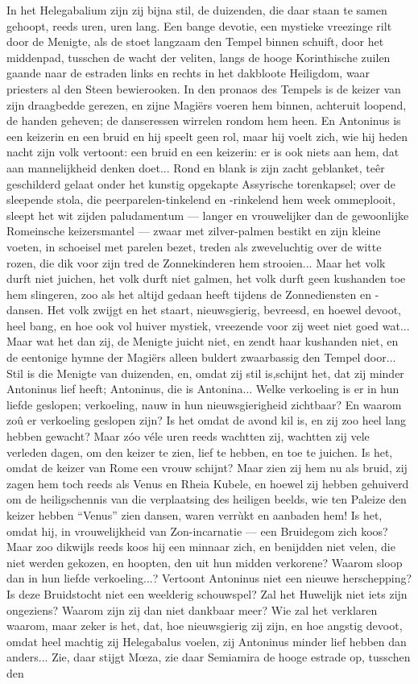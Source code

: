 \documentclass[a4paper, 12pt, oneside, dutch]{article}
\begin{document}
In het Helegabalium zijn zij bijna stil, de duizenden, die daar staan te samen gehoopt, reeds uren, uren lang. Een bange devotie, een mystieke vreezinge rilt door de Menigte, als de stoet langzaam den Tempel binnen schuift, door het middenpad, tusschen de wacht der veliten, langs de hooge Korinthische zuilen gaande naar de estraden links en rechts in het dakbloote Heiligdom, waar priesters al den Steen bewierooken. In den pronaos des Tempels is de keizer van zijn draagbedde gerezen, en zijne Magiërs voeren hem binnen, achteruit loopend, de handen geheven; de danseressen wirrelen rondom hem heen. En Antoninus is een keizerin en een bruid en hij speelt geen rol, maar hij voelt zich, wie hij heden nacht zijn volk vertoont: een bruid en een keizerin: er is ook niets aan hem, dat aan mannelijkheid denken doet... Rond en blank is zijn zacht geblanket, teêr geschilderd gelaat onder het kunstig opgekapte Assyrische torenkapsel; over de sleepende stola, die peerparelen-tinkelend en -rinkelend hem week ommeplooit, sleept het wit zijden paludamentum --- langer en vrouwelijker dan de gewoonlijke Romeinsche keizersmantel --- zwaar met zilver-palmen bestikt en zijn kleine voeten, in schoeisel met parelen bezet, treden als zweveluchtig over de witte rozen, die dik voor zijn tred de Zonnekinderen hem strooien... Maar het volk durft niet juichen, het volk durft niet galmen, het volk durft geen kushanden toe hem slingeren, zoo als het altijd gedaan heeft tijdens de Zonnediensten en -dansen. Het volk zwijgt en het staart, nieuwsgierig, bevreesd, en hoewel devoot, heel bang, en hoe ook vol huiver mystiek, vreezende voor zij weet niet goed wat... Maar wat het dan zij, de Menigte juicht niet, en zendt haar kushanden niet, en de eentonige hymne der Magiërs alleen buldert zwaarbassig den Tempel door... Stil is die Menigte van duizenden, en, omdat zij stil is,schijnt het, dat zij minder Antoninus lief heeft; Antoninus, die is Antonina... Welke verkoeling is er in hun liefde geslopen; verkoeling, nauw in hun nieuwsgierigheid zichtbaar? En waarom zoû er verkoeling geslopen zijn? Is het omdat de avond kil is, en zij zoo heel lang hebben gewacht? Maar zóo véle uren reeds wachtten zij, wachtten zij vele verleden dagen, om den keizer te zien, lief te hebben, en toe te juichen. Is het, omdat de keizer van Rome een vrouw schijnt? Maar zien zij hem nu als bruid, zij zagen hem toch reeds als Venus en Rheia Kubele, en hoewel zij hebben gehuiverd om de heiligschennis van die verplaatsing des heiligen beelds, wie ten Paleize den keizer hebben "`Venus"' zien dansen, waren verrùkt en aanbaden hem! Is het, omdat hij, in vrouwelijkheid van Zon-incarnatie --- een Bruidegom zich koos? Maar zoo dikwijls reeds koos hij een minnaar zich, en benijdden niet velen, die niet werden gekozen, en hoopten, den uit hun midden verkorene? Waarom sloop dan in hun liefde verkoeling...? Vertoont Antoninus niet een nieuwe herschepping? Is deze Bruidstocht niet een weelderig schouwspel? Zal het Huwelijk niet iets zijn ongeziens? Waarom zijn zij dan niet dankbaar meer? Wie zal het verklaren waarom, maar zeker is het, dat, hoe nieuwsgierig zij zijn, en hoe angstig devoot, omdat heel machtig zij Helegabalus voelen, zij Antoninus minder lief hebben dan anders... Zie, daar stijgt Mœza, zie daar Semiamira de hooge estrade op, tusschen den 
\end{document}
